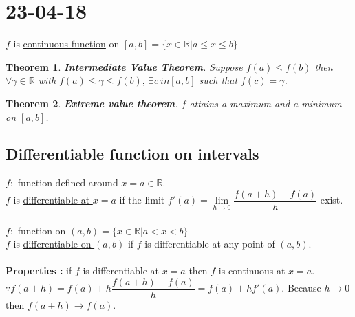\documentclass[a4paper,10pt]{article}
\newtheorem{theo}{Theorem}
\newcommand{\R}{\mathbb{R}}
\begin{document}
\newpage
\section{23-04-18}

$ f $ is \underline{continuous function} on $ [a,b] = \{x\in\R | a \leq x \leq b \} $

\begin{theo}
	\textbf{Intermediate Value Theorem}. Suppose $ f(a) \leq f(b) $ then $ \forall \gamma \in \R $ with $ f(a) \leq \gamma \leq f(b), \ \exists c\ in [a,b] $ such that $ f(c) = \gamma $.\hspace{3cm}
\end{theo}

\begin{theo}
	\textbf{Extreme value theorem}. $ f $ attains a maximum and a minimum on $ [a,b] $. \hspace{3cm}
\end{theo}

\subsection{Differentiable function on intervals}

$ f : $ function defined around $ x=a\in \R $.\\
$ f $ is \underline{differentiable at $ x=a $} if the limit $ f \prime (a) = \lim\limits_{h\rightarrow 0} \dfrac{f(a+h)-f(a)}{h}$ exist.\\ \\
$ f : $ function on $ (a,b)=\{ x\in\R | a<x<b \} $\\
$ f $ is \underline{differentiable on $ (a,b) $} if $ f $ is differentiable at any point of $ (a,b) $.\\ \\
\textbf{Properties :} if $ f $ is differentiable at $ x=a $ then $ f $ is continuous at $ x=a $.\\
$ \because f(a+h)=f(a) +h \dfrac{f(a+h)-f(a)}{h} = f(a)+hf\prime(a) $. Because $ h \rightarrow 0 $ then $ f(a+h)\rightarrow f(a) $.\\
\end{document}
